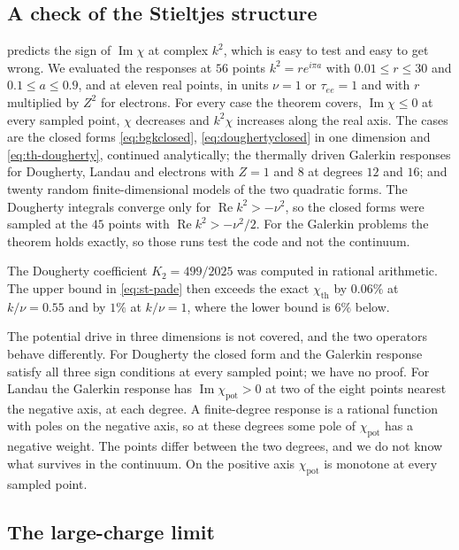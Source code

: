 \documentclass[11pt]{article}
\newcommand{\Real}{\operatorname{Re}}
\newcommand{\Imag}{\operatorname{Im}}
\newcommand{\thr}{\mathrm{th}}
\newcommand{\pot}{\mathrm{pot}}
\theoremstyle{definition}
\theoremstyle{remark}
\numberwithin{equation}{section}
\begin{document}
\subsection{A check of the Stieltjes structure}\label{sec:th-stcheck}

 predicts the sign of $\Imag\chi$ at complex $k^2$,
which is easy to test and easy to get wrong. We evaluated the responses at
$56$ points $k^2=re^{i\pi a}$ with $0.01\leq r\leq30$ and
$0.1\leq a\leq0.9$, and at eleven real points, in units $\nu=1$ or
$\tau_{ee}=1$ and with $r$ multiplied by $Z^2$ for electrons. For every case the theorem
covers, $\Imag\chi\leq0$ at every sampled point, $\chi$ decreases and
$k^2\chi$ increases along the real axis. The cases are the closed forms
\eqref{eq:bgkclosed}, \eqref{eq:doughertyclosed} in one dimension and
\eqref{eq:th-dougherty}, continued analytically; the thermally driven
Galerkin responses for Dougherty, Landau and electrons with $Z=1$ and
$8$ at degrees $12$ and $16$; and twenty random finite-dimensional models
of the two quadratic forms. The Dougherty integrals converge only for
$\Real k^2>-\nu^2$, so the closed forms were sampled at the $45$ points
with $\Real k^2>-\nu^2/2$. For the Galerkin problems the theorem holds
exactly, so those runs test the code and not the continuum.

The Dougherty coefficient $K_2=499/2025$ was computed in rational
arithmetic. The upper bound in \eqref{eq:st-pade} then exceeds the exact
$\chi_\thr$ by $0.06\%$ at $k/\nu=0.55$ and by $1\%$ at $k/\nu=1$, where
the lower bound is $6\%$ below.

The potential drive in three dimensions is not covered, and the two
operators behave differently. For Dougherty the closed form and the
Galerkin response satisfy all three sign conditions at every sampled
point; we have no proof. For Landau the Galerkin response has
$\Imag\chi_\pot>0$ at two of the eight points nearest the negative axis,
at each degree. A finite-degree response is a rational function with poles
on the negative axis, so at these degrees some pole of $\chi_\pot$ has a
negative weight. The points differ between the two degrees, and we do not
know what survives in the continuum. On the positive axis $\chi_\pot$ is
monotone at every sampled point.

\subsection{The large-charge limit}\label{sec:th-largeZnum}
\end{document}
